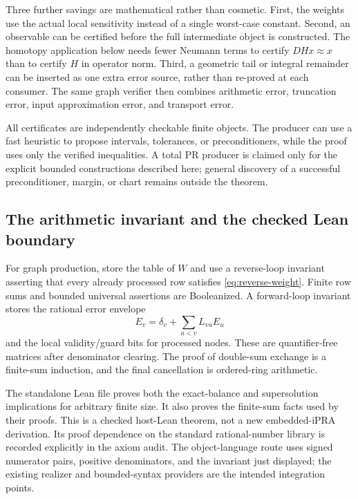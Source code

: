 Three further savings are mathematical rather than cosmetic. First, the weights use the actual local sensitivity instead of a single worst-case constant. Second, an observable can be certified before the full intermediate object is constructed. The homotopy application below needs fewer Neumann terms to certify $DHx\approx x$ than to certify $H$ in operator norm. Third, a geometric tail or integral remainder can be inserted as one extra error source, rather than re-proved at each consumer. The same graph verifier then combines arithmetic error, truncation error, input approximation error, and transport error.

All certificates are independently checkable finite objects. The producer can use a fast heuristic to propose intervals, tolerances, or preconditioners, while the proof uses only the verified inequalities. A total PR producer is claimed only for the explicit bounded constructions described here; general discovery of a successful preconditioner, margin, or chart remains outside the theorem.

\subsection{The arithmetic invariant and the checked Lean boundary}

For graph production, store the table of $W$ and use a reverse-loop invariant asserting that every already processed row satisfies \eqref{eq:reverse-weight}. Finite row sums and bounded universal assertions are Booleanized. A forward-loop invariant stores the rational error envelope
\[
 E_v=\delta_v+\sum_{u<v}L_{vu}E_u
\]
and the local validity/guard bits for processed nodes. These are quantifier-free matrices after denominator clearing. The proof of double-sum exchange is a finite-sum induction, and the final cancellation is ordered-ring arithmetic.

The standalone Lean file  proves both the exact-balance and supersolution implications for arbitrary finite size. It also proves the finite-sum facts used by their proofs. This is a checked host-Lean theorem, not a new embedded-iPRA derivation. Its proof dependence on the standard rational-number library is recorded explicitly in the axiom audit. The object-language route uses signed numerator pairs, positive denominators, and the invariant just displayed; the existing realizer and bounded-syntax providers are the intended integration points.
